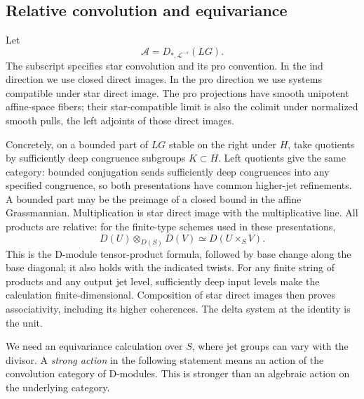 \subsection{Relative convolution and equivariance}

Let
\[
                     \mathcal A=D_{*,\mathcal L^{-s}}(LG).
\]
The subscript specifies star convolution and its pro convention.
In the ind direction we use closed direct images.  In the pro direction
we use systems compatible under star direct image.  The pro projections
have smooth unipotent affine-space fibers; their star-compatible limit
is also the colimit under normalized smooth pulls, the left adjoints of
those direct images.

Concretely, on a bounded part of $LG$ stable on the right under $H$, take
quotients by sufficiently deep congruence subgroups $K\subset H$.  Left
quotients give the same category: bounded conjugation sends sufficiently
deep congruences into any specified congruence, so both presentations
have common higher-jet refinements.  A bounded part may be the preimage
of a closed bound in the affine Grassmannian.  Multiplication is star
direct image with the multiplicative line.  All products are relative:
for the finite-type schemes used in these presentations,
\[
                 D(U)\otimes_{D(S)}D(V)
                       \simeq D(U\times_S V).
\]
This is the D-module tensor-product formula, followed by base change
along the base diagonal; it also holds with the indicated twists.
For any finite string of products and any output jet level, sufficiently
deep input levels make the calculation finite-dimensional.  Composition
of star direct images then proves associativity, including its higher
coherences.  The delta system at the identity is the unit.

We need an equivariance calculation over $S$, where jet groups can vary
with the divisor.  A \emph{strong action} in the following statement
means an action of the convolution category of D-modules.  This is
stronger than an algebraic action on the underlying category.

